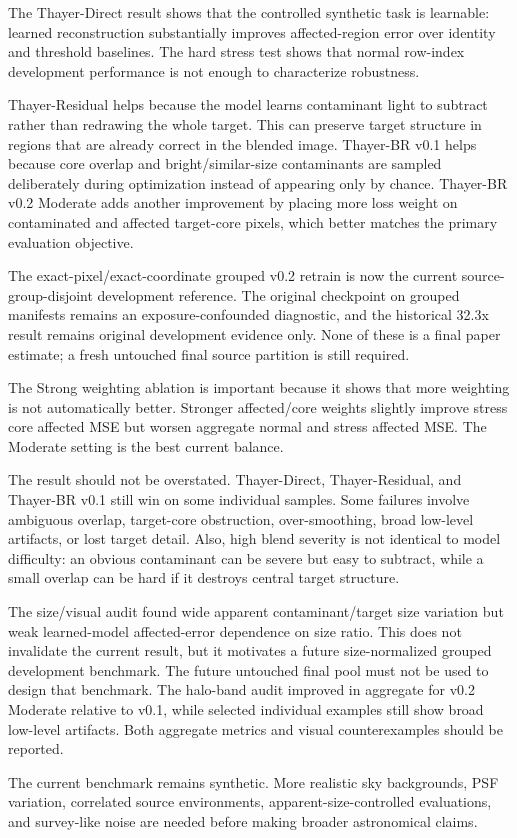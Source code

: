 The Thayer-Direct result shows that the controlled synthetic task is learnable:
learned reconstruction substantially improves affected-region error over
identity and threshold baselines. The hard stress test shows that normal
row-index development performance is not enough to characterize robustness.

Thayer-Residual helps because the model learns contaminant light to subtract
rather than redrawing the whole target. This can preserve target structure in
regions that are already correct in the blended image. Thayer-BR v0.1 helps
because core overlap and bright/similar-size contaminants are sampled
deliberately during optimization instead of appearing only by chance.
Thayer-BR v0.2 Moderate adds another improvement by placing more loss weight on
contaminated and affected target-core pixels, which better matches the primary
evaluation objective.

The exact-pixel/exact-coordinate grouped v0.2 retrain is now the current
source-group-disjoint development reference. The original checkpoint on grouped
manifests remains an exposure-confounded diagnostic, and the historical 32.3x
result remains original development evidence only. None of these is a final
paper estimate; a fresh untouched final source partition is still required.

The Strong weighting ablation is important because it shows that more weighting
is not automatically better. Stronger affected/core weights slightly improve
stress core affected MSE but worsen aggregate normal and stress affected MSE.
The Moderate setting is the best current balance.

The result should not be overstated. Thayer-Direct, Thayer-Residual, and
Thayer-BR v0.1 still win on some individual samples. Some failures involve
ambiguous overlap, target-core obstruction, over-smoothing, broad low-level
artifacts, or lost target detail. Also, high blend severity is not identical to
model difficulty: an obvious contaminant can be severe but easy to subtract,
while a small overlap can be hard if it destroys central target structure.

The size/visual audit found wide apparent contaminant/target size variation but
weak learned-model affected-error dependence on size ratio. This does not
invalidate the current result, but it motivates a future size-normalized
grouped development benchmark. The future untouched final pool must not be used
to design that benchmark. The halo-band audit improved in aggregate for v0.2 Moderate
relative to v0.1, while selected individual examples still show broad low-level
artifacts. Both aggregate metrics and visual counterexamples should be reported.

The current benchmark remains synthetic. More realistic sky backgrounds, PSF
variation, correlated source environments, apparent-size-controlled
evaluations, and survey-like noise are needed before making broader
astronomical claims.

